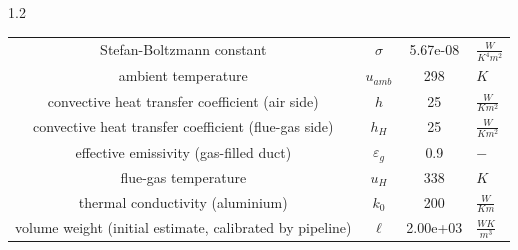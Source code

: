 \documentclass[preview]{standalone}
\begin{document}
\begin{spacing}{1.2}
\begin{tabular}{cccl}
\toprule
Stefan-Boltzmann constant & $\sigma$ & 5.67e-08 & $\frac{W}{K^4 m^2}$ \\ 
ambient temperature & $u_{amb}$ & 298 & $K$ \\ 
convective heat transfer coefficient (air side) & $h$ & 25 & $\frac{W}{K m^2}$ \\ 
convective heat transfer coefficient (flue-gas side) & $h_{H}$ & 25 & $\frac{W}{K m^2}$ \\ 
effective emissivity (gas-filled duct) & $\varepsilon_{g}$ & 0.9 & $-$ \\ 
flue-gas temperature & $u_{H}$ & 338 & $K$ \\ 
thermal conductivity (aluminium) & $k_{0}$ & 200 & $\frac{W}{K m}$ \\ 
volume weight (initial estimate, calibrated by pipeline) & $\ell$ & 2.00e+03 & $\frac{W K}{m^3}$ \\ 
\bottomrule
\end{tabular}
\end{spacing}
\end{document}
